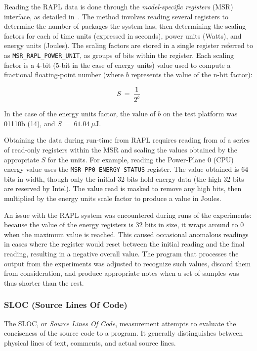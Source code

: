 Reading the RAPL data is done through the \textit{model-specific registers} (MSR) interface, as detailed in~\cite[Chapter~14]{intel.sdm.2022}. The method involves reading several registers to determine the number of packages the system has, then determining the scaling factors for each of time units (expressed in seconds), power units (Watts), and energy units (Joules). The scaling factors are stored in a single register referred to as \texttt{MSR\_RAPL\_POWER\_UNIT}, as groups of bits within the register. Each scaling factor is a 4-bit (5-bit in the case of energy units) value used to compute a fractional floating-point number (where $b$ represents the value of the n-bit factor):

\[S~=~\frac{1}{2^{b}}\]

In the case of the energy units factor, the value of $b$ on the test platform was 01110b (14), and $S~=~61.04~\mu$J.

Obtaining the data during run-time from RAPL requires reading from of a series of read-only registers within the MSR and scaling the values obtained by the appropriate $S$ for the units. For example, reading the Power-Plane 0 (CPU) energy value uses the \texttt{MSR\_PP0\_ENERGY\_STATUS} register. The value obtained is 64 bits in width, though only the initial 32 bits hold energy data (the high 32 bits are reserved by Intel). The value read is masked to remove any high bits, then multiplied by the energy units scale factor to produce a value in Joules.

An issue with the RAPL system was encountered during runs of the experiments: because the value of the energy registers is 32 bits in size, it wraps around to 0 when the maximum value is reached. This caused occasional anomalous readings in cases where the register would reset between the initial reading and the final reading, resulting in a negative overall value. The program that processes the output from the experiments was adjusted to recognize such values, discard them from consideration, and produce appropriate notes when a set of samples was thus shorter than the rest.

\subsubsection{SLOC (Source Lines Of Code)}

The SLOC, or \textit{Source Lines Of Code}, measurement attempts to evaluate the conciseness of the source code to a program. It generally distinguishes between physical lines of text, comments, and actual source lines.

